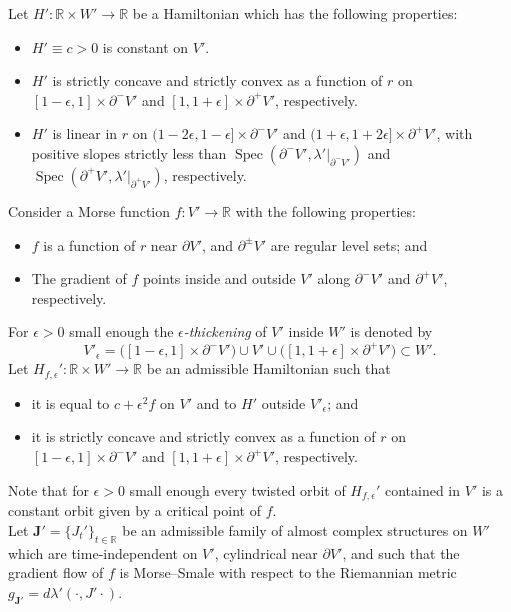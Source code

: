 \documentclass[12pt]{article}
\theoremstyle{theorem}
\theoremstyle{definition}
\theoremstyle{remark}
\numberwithin{equation}{section}
\newcommand{\p}{\partial}
\newcommand{\R}{{\mathbb{R}}}
\DeclareMathOperator{\Spec}{Spec}
\begin{document}
\noindent Let $H'\colon \R\times W'\to \R$ be a Hamiltonian which has the following properties:
\begin{itemize}
	\item $H'\equiv c>0$ is constant on $V'$.
	\item $H'$ is strictly concave and strictly convex as a function of $r$ on $[1-\epsilon, 1]\times \p^-V'$ and $[1, 1+\epsilon]\times \p^+V'$, respectively.
	\item $H'$ is linear in $r$ on $(1-2\epsilon,1-\epsilon]\times \p^- V'$ and $(1+\epsilon,1+2\epsilon]\times \p^+ V'$, with positive slopes strictly less than $\Spec(\p^- V',\lambda'|_{\p^- V'})$ and $\Spec(\p^+ V',\lambda'|_{\p^+ V'})$, respectively.
\end{itemize}
Consider a Morse function $f\colon V'\to \R$ with the following properties:
\begin{itemize}
	\item $f$ is a function of $r$ near $\p V'$, and $\p^\pm V'$ are regular level sets; and
	\item The gradient of $f$ points inside and outside $V'$ along $\p^-V'$ and $\p^+V'$, respectively.
\end{itemize}
For $\epsilon>0$ small enough the \emph{$\epsilon$-thickening} of $V'$ inside $W'$ is denoted by
$$
V'_\epsilon=\big([1-\epsilon,1]\times \p^- V'\big)\cup V' \cup \big([1,1+\epsilon]\times \p^+ V'\big) \subset W'.
$$
Let $H_{f,\epsilon}'\colon \R\times W'\to \R$ be an admissible Hamiltonian such that
\begin{itemize}
	\item it is equal to $c+\epsilon^2f$ on $V'$ and to $H'$ outside $V'_\epsilon$; and
	\item it is strictly concave and strictly convex as a function of $r$ on $[1-\epsilon,1]\times \p^-V'$ and $[1,1+\epsilon]\times \p^+V'$, respectively.
\end{itemize}
Note that for $\epsilon>0$ small enough every twisted orbit of $H_{f,\epsilon}'$ contained in $V'$ is a constant orbit given by a critical point of $f$.\\

\noindent Let $\bm{J}'=\{J_t'\}_{t\in \R}$ be an admissible family of almost complex structures on $W'$ which are time-independent on $V'$, cylindrical near $\p V'$, and such that the gradient flow of $f$ is Morse--Smale with respect to the Riemannian metric $g_{\bm{J}'}=d\lambda'(\cdot, J'\cdot)$.
\end{document}
